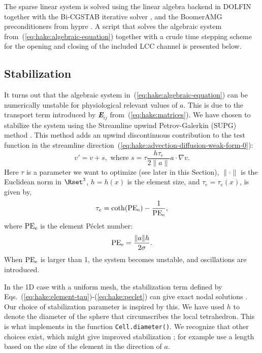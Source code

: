 The sparse linear system is solved using the \petsc linear algebra
backend \citep{BalayBuschelmanGroppEtAl2001} in DOLFIN together with
the Bi-CGSTAB iterative solver \citep{Vorst1992}, and the BoomerAMG
preconditioners from hypre \citep{FalgoutYang2002}. A script that
solves the algebraic system from~(\ref{eq:hake:algebraic-equation})
together with a crude time stepping scheme for the opening and closing
of the included LCC channel is presented below.

\subsection{Stabilization}
\label{sec:hake:stabilization}

It turns out that the algebraic system
in~(\ref{eq:hake:algebraic-equation}) can be numerically unstable for
physiological relevant values of $a$. This is due to the transport
term introduced by {\bfseries\itshape E}$_{ij}$
from~(\ref{eq:hake:matrices}). We have chosen to stabilize the system
using the Streamline upwind Petrov-Galerkin (SUPG) method
\citep{BrooksHughes1982}. This method adds an upwind discontinuous
contribution to the test function in the streamline
direction~(\ref{eq:hake:advection-diffusion-weak-form-0}):
\begin{equation}
  \label{eq:hake:stabilizing-term}
  v' = v+s, \text{ where } s = \tau\frac{h\tau_e}{2\|a\|}a\cdot\nabla v.
\end{equation}
Here $\tau$ is a parameter we want to optimize (see later in this
Section), $\|\cdot\|$ is the Euclidean norm in $\Rset^3$, $h=h(x)$ is
the element size, and $\tau_e=\tau_e(x)$, is given by,
\begin{equation}
  \label{eq:hake:element-tau}
  \tau_e=\coth(\mathrm{PE}_{\mathrm{e}})-\frac{1}{\mathrm{PE}_{\mathrm{e}}},
\end{equation}
where $\mathrm{PE}_{\mathrm{e}}$ is the element P\'eclet number:
\begin{equation}
  \label{eq:hake:peclet}
  \mathrm{PE}_{\mathrm{e}} = \frac{\|a\|h}{2\sigma}.
\end{equation}
When $\mathrm{PE}_{\mathrm{e}}$ is larger than 1, the system becomes unstable, and
oscillations are introduced.

In the 1D case with a uniform mesh, the stabilization term defined by
Eqs.~(\ref{eq:hake:element-tau})-(\ref{eq:hake:peclet}) can give exact
nodal solutions
\citep{ChristieGriffithsMitchellEtAl1976,BrooksHughes1982}. Our choice
of stabilization parameter is inspired by this.
We have used $h$ to denote the
diameter of the sphere that circumscribes the local tetrahedron.
This is what \dolfin implements in the function
\texttt{Cell.diameter()}. We recognize that other choices exist, which
might give improved stabilization \citep{JohnKnobloch2007}; for example
\citet{TezduyarPark1986} use a length based on the size of the element
in the direction of $a$.

